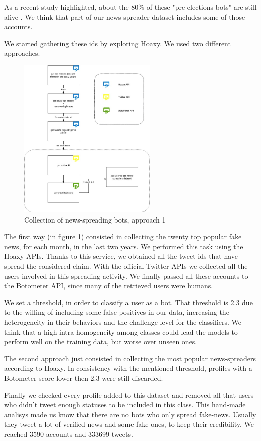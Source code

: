As a recent study highlighted, about the 80\% of these "pre-elections bots" are still alive \cite{Disinformation}. We think that part of our news-spreader dataset includes some of those accounts.

We started gathering these ids by exploring Hoaxy.
We used two different approaches.
\begin{figure}
	\centering
	\includegraphics[width=250px]{chapter3/figure/news-spreader.jpg}
	\caption{Collection of news-spreading bots, approach 1}
	\label{fig:news-spreaders}
\end{figure}
The first way (in figure \ref{fig:news-spreaders}) consisted in collecting the twenty top popular fake news, for each month, in the last two years. We performed this task using the Hoaxy APIs. Thanks to this service, we obtained all the tweet ids that have spread the considered claim. With the official Twitter APIs we collected all the users involved in this spreading activity. We finally passed all these accounts to the Botometer API, since many of the retrieved users were humans.

We set a threshold, in order to classify a user as a bot. That threshold is 2.3 due to the willing of including some false positives in our data, increasing the heterogeneity in their behaviors and the challenge level for the classifiers. We think that a high intra-homogeneity among classes could lead the models to perform well on the training data, but worse over unseen ones.

The second approach just consisted in collecting the most popular news-spreaders according to Hoaxy. In consistency with the mentioned threshold, profiles with a Botometer score lower then 2.3 were still discarded.

Finally we checked every profile added to this dataset and removed all that users who didn't tweet enough statuses to be included in this class. This hand-made analisys made us know that there are no bots who only spread fake-news. Usually they tweet a lot of verified news and some fake ones, to keep their credibility.
We reached 3590 accounts and 333699 tweets.

